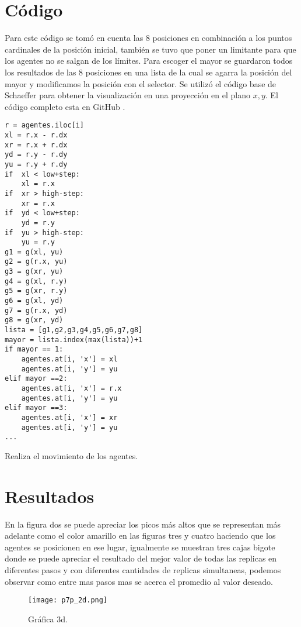 \documentclass{article}
\begin{document}
\section{Código}
Para este código se tomó en cuenta las 8 posiciones en combinación a los puntos cardinales de la posición inicial, también se tuvo que poner un limitante para que los agentes no se salgan de los límites.
Para escoger el mayor se guardaron todos los resultados de las 8 posiciones en una lista de la cual se agarra la posición del mayor y modificamos la posición con el selector. Se utilizó el código base de Schaeffer \cite{Elisa_Schaeffer} para obtener la visualización en una proyección en el plano $x , y$. El código completo esta en GitHub \cite{Denisse_Leyva}.
\renewcommand{\listingscaption}{Código}
\begin{listing}[H]
  \begin{verbatim}
r = agentes.iloc[i]
xl = r.x - r.dx
xr = r.x + r.dx
yd = r.y - r.dy
yu = r.y + r.dy
if  xl < low+step:
    xl = r.x
if  xr > high-step:
    xr = r.x
if  yd < low+step:
    yd = r.y
if  yu > high-step:
    yu = r.y
g1 = g(xl, yu)
g2 = g(r.x, yu)
g3 = g(xr, yu)
g4 = g(xl, r.y)
g5 = g(xr, r.y)
g6 = g(xl, yd)
g7 = g(r.x, yd)
g8 = g(xr, yd)
lista = [g1,g2,g3,g4,g5,g6,g7,g8]
mayor = lista.index(max(lista))+1   
if mayor == 1:
    agentes.at[i, 'x'] = xl
    agentes.at[i, 'y'] = yu
elif mayor ==2:
    agentes.at[i, 'x'] = r.x
    agentes.at[i, 'y'] = yu
elif mayor ==3:
    agentes.at[i, 'x'] = xr
    agentes.at[i, 'y'] = yu
...
    \end{verbatim}
  \label{lst:fibo}
  \caption{Realiza el movimiento de los agentes.}
\end{listing}

\section{Resultados}
En la figura dos se puede apreciar los picos más altos que se representan más adelante como el color amarillo en las figuras tres y cuatro haciendo que los agentes se posicionen en ese lugar, igualmente se muestran tres cajas bigote donde se puede apreciar el resultado del mejor valor de todas las replicas en diferentes pasos y con diferentes cantidades de replicas simultaneas, podemos observar como entre mas pasos mas se acerca el promedio al valor deseado.


\begin{figure}[H]
\centering
\texttt{[image: p7p\_2d.png]}
\caption{\label{fig3} Gráfica 3d.}
\end{figure}
\end{document}
